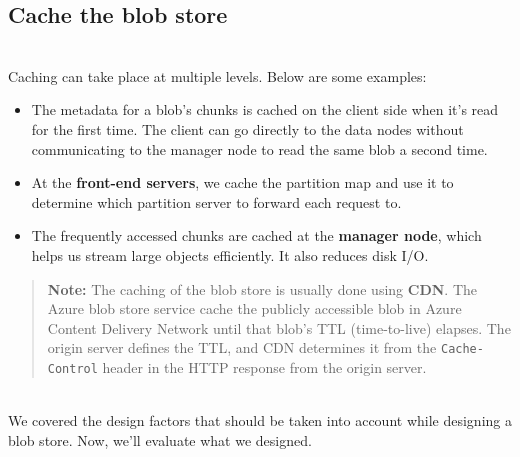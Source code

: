 \subsection{Cache the blob store}\label{kHCod9BmE6rMB5UFnO7SK}
\\
Caching can take place at multiple levels. Below are some examples:

\begin{itemize}
\item
\protect{}\label{mOt3KM9ID0TrqsjUZ__Ux}
The metadata for a blob's chunks is cached on the client side when it's read for the first time. The client can go directly to the data nodes without communicating to the manager node to read the same blob a second time.
\item
\protect{}\label{PEniBCm6gsTQLw9xHKgJb}
At the \textbf{front-end servers}, we cache the partition map and use it to determine which partition server to forward each request to.
\item
\protect{}\label{02G7UZed38_3eUJbHtJ2x}
The frequently accessed chunks are cached at the \textbf{manager node}, which helps us stream large objects efficiently. It also reduces disk I/O.
\end{itemize}
\begin{quote}
\textbf{Note:} The caching of the blob store is usually done using \textbf{CDN}. The Azure blob store service cache the publicly accessible blob in Azure Content Delivery Network until that blob's TTL (time-to-live) elapses. The origin server defines the TTL, and CDN determines it from the \texttt{Cache-Control} header in the HTTP response from the origin server.
\end{quote}
\\
We covered the design factors that should be taken into account while designing a blob store. Now, we'll evaluate what we designed.

